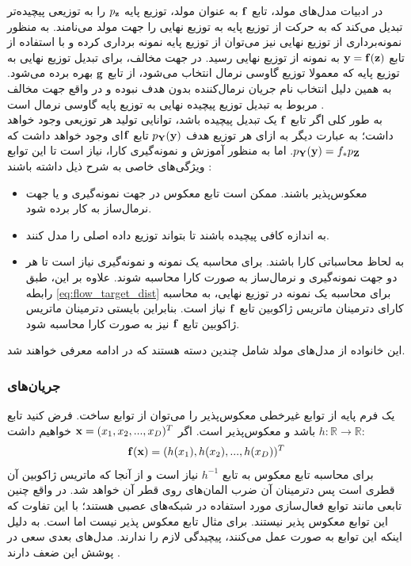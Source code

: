 در ادبیات مدل‌های مولد، تابع $\bf f$ به عنوان مولد، توزیع پایه
$p_{\bf z}$
را به توزیعی پیچیده‌تر تبدیل می‌کند که به حرکت از توزیع پایه به توزیع نهایی را جهت مولد می‌نامند. به منظور نمونه‌برداری از توزیع نهایی نیز می‌توان از توزیع پایه نمونه برداری کرده و با استفاده از تابع
${\bf y} = {\bf f} ( {\bf z} )$
به نمونه از توزیع نهایی رسید. در جهت مخالف، برای تبدیل توزیع نهایی به توزیع پایه که معمولا توزیع گاوسی نرمال انتخاب می‌شود، از تابع $\bf g$ بهره برده می‌شود. به همین دلیل انتخاب نام جریان نرمال‌کننده بدون هدف نبوده و در واقع جهت مخالف مربوط به تبدیل توزیع پیچیده نهایی به توزیع پایه گاوسی نرمال است \cite{flow_survey}.
\\
به طور کلی اگر تابع $\bf f$ یک تبدیل پیچیده باشد، توانایی تولید هر توزیعی وجود خواهد داشت؛ به عبارت دیگر به ازای هر توزیع هدف
$ p_{\bf Y}({\bf y})$
تابع $\bf f$ای وجود خواهد داشت که
$ p_{\bf Y}({\bf y}) = f_*p_{\bf Z}$.
اما به منظور آموزش و نمونه‌گیری کارا، نیاز است تا این توابع ویژگی‌های خاصی به شرح ذیل داشته باشند \cite{flow_survey}:
\begin{itemize}
    \item
    معکوس‌پذیر باشند. ممکن است تابع معکوس در جهت نمونه‌گیری و یا جهت نرمال‌ساز به کار برده شود.
    \item
    به اندازه کافی پیچیده باشند تا بتواند توزیع داده اصلی را مدل کنند.
    \item
    به لحاظ محاسباتی کارا باشند. برای محاسبه \likelihood{} یک نمونه و نمونه‌گیری نیاز است تا هر دو جهت نمونه‌گیری و نرمال‌ساز به صورت کارا محاسبه شوند. علاوه بر این، طبق رابطه \ref{eq:flow_target_dist} برای محاسبه  \likelihood{} یک نمونه در توزیع نهایی، به محاسبه کارای دترمینان ماتریس ژاکوبین تابع $\bf f$ نیاز است. بنابراین بایستی دترمینان ماتریس ژاکوبین تابع $\bf f$ نیز به صورت کارا محاسبه شود.
\end{itemize}
این خانواده از مدل‌های مولد شامل چندین دسته هستند که در ادامه معرفی خواهند شد.
\subsubsection{جریان‌های
    }
یک فرم پایه از توابع غیرخطی معکوس‌پذیر را می‌توان از توابع \elementwise{} ساخت. فرض کنید تابع
$h: \mathbb{R} \rightarrow \mathbb{R}$
باشد و معکوس‌پذیر است. اگر
${\bf x} = (x_1, x_2, ..., x_D)^T$
خواهیم داشت:
\begin{gather}
{\bf f}({\bf x}) = (h(x_1), h(x_2), ..., h(x_D))^T
\end{gather}
برای محاسبه تابع معکوس به تابع $h^{-1}$ نیاز است و از آنجا که ماتریس ژاکوبین آن قطری است پس دترمینان آن ضرب المان‌های روی قطر آن خواهد شد. در واقع چنین تابعی مانند توابع فعال‌سازی مورد استفاده در شبکه‌های عصبی هستند؛ با این تفاوت که این توابع معکوس پذیر نیستند. برای مثال تابع  معکوس پذیر نیست اما  است. به دلیل اینکه این توابع به صورت \elementwise{} عمل می‌کنند، پیچیدگی لازم را ندارند. مدل‌های بعدی سعی در پوشش این ضعف دارند \cite{flow_survey, realnvp, iaf, maf}.
